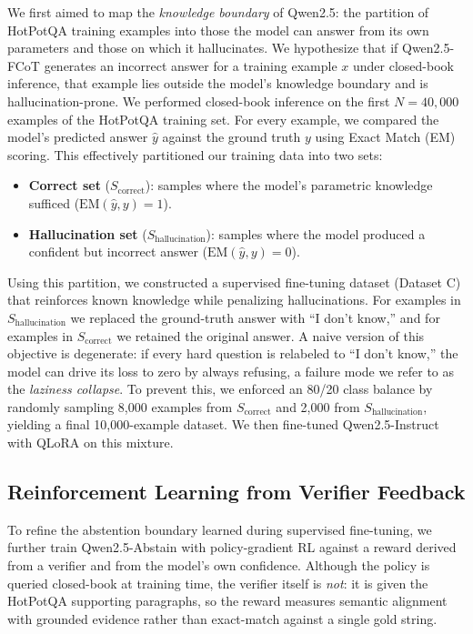 \documentclass[11pt]{article}
\begin{document}
We first aimed to map the \emph{knowledge boundary} of Qwen2.5: the partition of HotPotQA training examples into those the model can answer from its own parameters and those on which it hallucinates. We hypothesize that if Qwen2.5-FCoT generates an incorrect answer for a training example $x$ under closed-book inference, that example lies outside the model's knowledge boundary and is hallucination-prone. We performed closed-book inference on the first $N=40{,}000$ examples of the HotPotQA training set. For every example, we compared the model's predicted answer $\hat{y}$ against the ground truth $y$ using Exact Match (EM) scoring. This effectively partitioned our training data into two sets: 
\begin{itemize}
    \item \textbf{Correct set} ($S_{\text{correct}}$): samples where the model's parametric knowledge sufficed ($\text{EM}(\hat{y}, y) = 1$).
    \item \textbf{Hallucination set} ($S_{\text{hallucination}}$): samples where the model produced a confident but incorrect answer ($\text{EM}(\hat{y}, y) = 0$).
\end{itemize}

Using this partition, we constructed a supervised fine-tuning dataset (Dataset C) that reinforces known knowledge while penalizing hallucinations. For examples in $S_{\text{hallucination}}$ we replaced the ground-truth answer with ``I don't know,'' and for examples in $S_{\text{correct}}$ we retained the original answer. A naive version of this objective is degenerate: if every hard question is relabeled to ``I don't know,'' the model can drive its loss to zero by always refusing, a failure mode we refer to as the \emph{laziness collapse}. To prevent this, we enforced an 80/20 class balance by randomly sampling 8{,}000 examples from $S_{\text{correct}}$ and 2{,}000 from $S_{\text{hallucination}}$, yielding a final 10{,}000-example dataset. We then fine-tuned Qwen2.5-Instruct with QLoRA on this mixture.

\subsection{Reinforcement Learning from Verifier Feedback}\label{sec:rlvf}

To refine the abstention boundary learned during supervised fine-tuning, we further train Qwen2.5-Abstain with policy-gradient RL against a reward derived from a verifier and from the model's own confidence. Although the policy is queried closed-book at training time, the verifier itself is \emph{not}: it is given the HotPotQA supporting paragraphs, so the reward measures semantic alignment with grounded evidence rather than exact-match against a single gold string.
\end{document}
